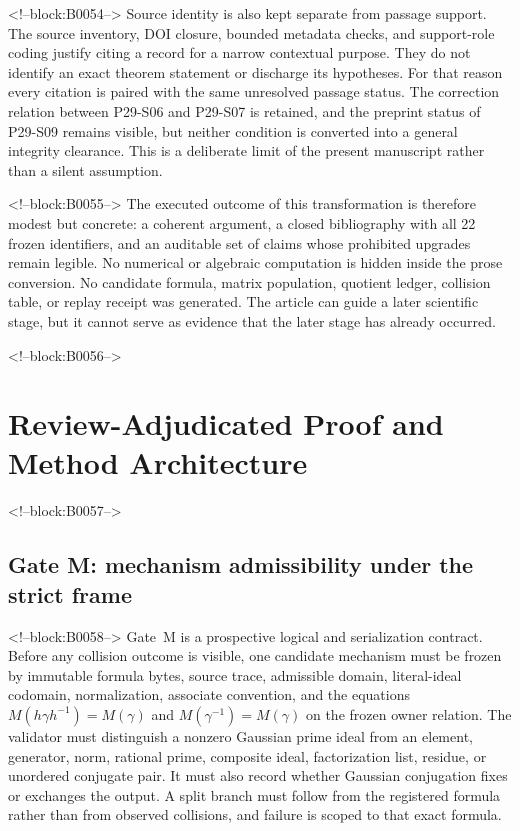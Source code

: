 \documentclass[11pt,a4paper]{article}
\begin{document}
<!--block:B0054-->
Source identity is also kept separate from passage support. The source inventory, DOI closure, bounded metadata checks, and support-role coding justify citing a record for a narrow contextual purpose. They do not identify an exact theorem statement or discharge its hypotheses. For that reason every citation is paired with the same unresolved passage status. The correction relation between P29-S06 and P29-S07 is retained, and the preprint status of P29-S09 remains visible, but neither condition is converted into a general integrity clearance. This is a deliberate limit of the present manuscript rather than a silent assumption.

<!--block:B0055-->
The executed outcome of this transformation is therefore modest but concrete: a coherent argument, a closed bibliography with all 22 frozen identifiers, and an auditable set of claims whose prohibited upgrades remain legible. No numerical or algebraic computation is hidden inside the prose conversion. No candidate formula, matrix population, quotient ledger, collision table, or replay receipt was generated. The article can guide a later scientific stage, but it cannot serve as evidence that the later stage has already occurred.

<!--block:B0056-->
\section{Review-Adjudicated Proof and Method Architecture}

<!--block:B0057-->
\subsection{Gate M: mechanism admissibility under the strict frame}

<!--block:B0058-->
Gate~M is a prospective logical and serialization contract. Before any collision outcome is visible, one candidate mechanism must be frozen by immutable formula bytes, source trace, admissible domain, literal-ideal codomain, normalization, associate convention, and the equations \(M(h\gamma h^{-1})=M(\gamma)\) and \(M(\gamma^{-1})=M(\gamma)\) on the frozen owner relation. The validator must distinguish a nonzero Gaussian prime ideal from an element, generator, norm, rational prime, composite ideal, factorization list, residue, or unordered conjugate pair. It must also record whether Gaussian conjugation fixes or exchanges the output. A split branch must follow from the registered formula rather than from observed collisions, and failure is scoped to that exact formula.
\end{document}
